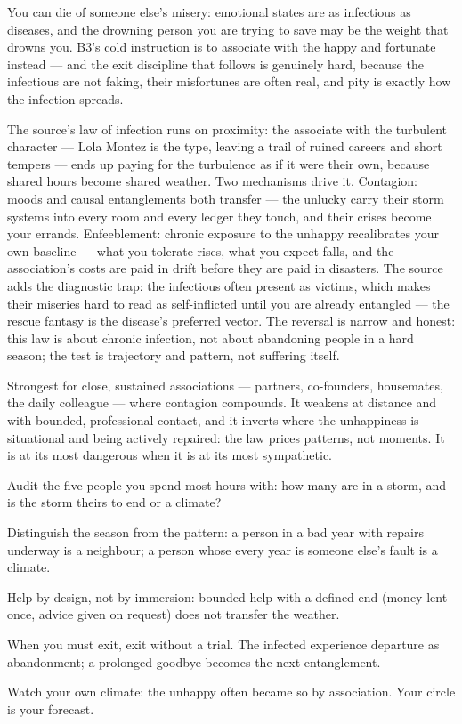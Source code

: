 \begin{core}
You can die of someone else's misery: emotional states are as infectious as diseases, and the drowning person you are trying to save may be the weight that drowns you. B3's cold instruction is to associate with the happy and fortunate instead --- and the exit discipline that follows is genuinely hard, because the infectious are not faking, their misfortunes are often real, and pity is exactly how the infection spreads.
\end{core}
\begin{mechanism}
The source's law of infection runs on proximity: the associate with the turbulent character --- Lola Montez is the type, leaving a trail of ruined careers and short tempers --- ends up paying for the turbulence as if it were their own, because shared hours become shared weather. Two mechanisms drive it. Contagion: moods and causal entanglements both transfer --- the unlucky carry their storm systems into every room and every ledger they touch, and their crises become your errands. Enfeeblement: chronic exposure to the unhappy recalibrates your own baseline --- what you tolerate rises, what you expect falls, and the association's costs are paid in drift before they are paid in disasters. The source adds the diagnostic trap: the infectious often present as victims, which makes their miseries hard to read as self-inflicted until you are already entangled --- the rescue fantasy is the disease's preferred vector. The reversal is narrow and honest: this law is about chronic infection, not about abandoning people in a hard season; the test is trajectory and pattern, not suffering itself.
\end{mechanism}
\begin{conditions}
Strongest for close, sustained associations --- partners, co-founders, housemates, the daily colleague --- where contagion compounds. It weakens at distance and with bounded, professional contact, and it inverts where the unhappiness is situational and being actively repaired: the law prices patterns, not moments. It is at its most dangerous when it is at its most sympathetic.
\end{conditions}
\begin{application}
  \item Audit the five people you spend most hours with: how many are in a storm, and is the storm theirs to end or a climate?
  \item Distinguish the season from the pattern: a person in a bad year with repairs underway is a neighbour; a person whose every year is someone else's fault is a climate.
  \item Help by design, not by immersion: bounded help with a defined end (money lent once, advice given on request) does not transfer the weather.
  \item When you must exit, exit without a trial. The infected experience departure as abandonment; a prolonged goodbye becomes the next entanglement.
  \item Watch your own climate: the unhappy often became so by association. Your circle is your forecast.
\end{application}
